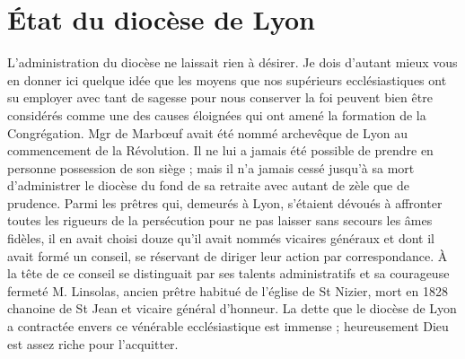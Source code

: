\section*{État du diocèse de Lyon}
L'administration du diocèse ne laissait rien à désirer. Je dois d'autant mieux vous en donner ici quelque idée que les moyens que nos supérieurs ecclésiastiques ont su employer avec tant de sagesse pour nous conserver la foi peuvent bien être considérés comme une des causes éloignées qui ont amené la formation de la Congrégation. Mgr de Marbœuf avait été nommé archevêque de Lyon au commencement de la Révolution. Il ne lui a jamais été possible de prendre en personne possession de son siège ; mais il n'a jamais cessé jusqu'à sa mort d'administrer le diocèse du fond de sa retraite avec autant de zèle que de prudence. Parmi les prêtres qui, demeurés à Lyon, s'étaient dévoués à affronter toutes les rigueurs de la persécution pour ne pas laisser sans secours les âmes fidèles, il en avait choisi douze qu'il avait nommés vicaires généraux et dont il avait formé un conseil, se réservant de diriger leur action par correspondance. À la tête de ce conseil se distinguait par ses talents administratifs et sa courageuse fermeté M. Linsolas, ancien prêtre habitué de l'église de St Nizier, mort en 1828 chanoine de St Jean et vicaire général d'honneur. La dette que le diocèse de Lyon a contractée envers ce vénérable ecclésiastique est immense ; heureusement Dieu est assez riche pour l'acquitter.

